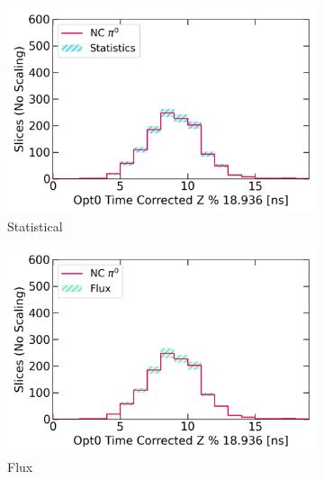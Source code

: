 \begin{figure}[htbp!]
        \begin{subfigure}[b]{0.495\textwidth}   
            \centering 
            \includegraphics[width=\textwidth]{ncpi0_stats_error}
            \caption{Statistical}%
            \label{fig:bkg_stat}
        \end{subfigure}
        \hfill
        \begin{subfigure}[b]{0.495\textwidth}   
            \centering 
            \includegraphics[width=\textwidth]{ncpi0_flx_err}
            \caption{Flux}%
            \label{fig:bkg_flux}
        \end{subfigure}
        \centering
        \begin{subfigure}[b]{0.495\textwidth}   
            \centering 

\end{subfigure}
\end{figure}
